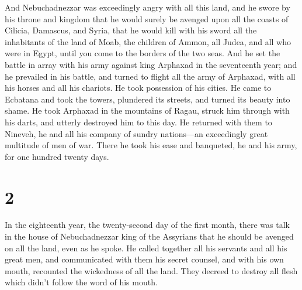  And Nebuchadnezzar was exceedingly angry with all this
land, and he swore by his throne and kingdom that he would surely be
avenged upon all the coasts of Cilicia, Damascus, and Syria, that he
would kill with his sword all the inhabitants of the land of Moab, the
children of Ammon, all Judea, and all who were in Egypt, until you come
to the borders of the two seas.  And he set the battle in
array with his army against king Arphaxad in the seventeenth year; and
he prevailed in his battle, and turned to flight all the army of
Arphaxad, with all his horses and all his chariots.  He
took possession of his cities. He came to Ecbatana and took the towers,
plundered its streets, and turned its beauty into shame. 
He took Arphaxad in the mountains of Ragau, struck him through with his
darts, and utterly destroyed him to this day.  He returned
with them to Nineveh, he and all his company of sundry nations---an
exceedingly great multitude of men of war. There he took his ease and
banqueted, he and his army, for one hundred twenty days.

\hypertarget{section-1}{%
\section{2}\label{section-1}}

 In the eighteenth year, the twenty-second day of the first
month, there was talk in the house of Nebuchadnezzar king of the
Assyrians that he should be avenged on all the land, even as he spoke.
 He called together all his servants and all his great men,
and communicated with them his secret counsel, and with his own mouth,
recounted the wickedness of all the land.  They decreed to
destroy all flesh which didn't follow the word of his mouth.

